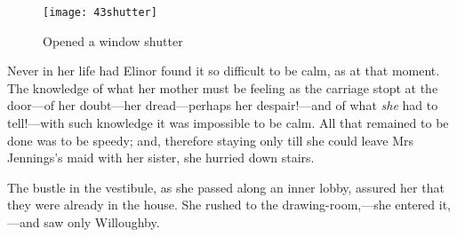 \begin{letter}
	\begin{figure}[tbph]
		\centering
		\texttt{[image: 43shutter]}
		\caption{Opened a window shutter}
	\end{figure}
\end{letter}

Never in her life had Elinor found it so difficult to be calm, as at that moment. The knowledge of what her mother must be feeling as the carriage stopt at the door—of her doubt—her dread—perhaps her despair!—and of what \textit{she} had to tell!—with such knowledge it was impossible to be calm. All that remained to be done was to be speedy; and, therefore staying only till she could leave Mrs Jennings’s maid with her sister, she hurried down stairs.

The bustle in the vestibule, as she passed along an inner lobby, assured her that they were already in the house. She rushed to the drawing-room,—she entered it,—and saw only Willoughby.
